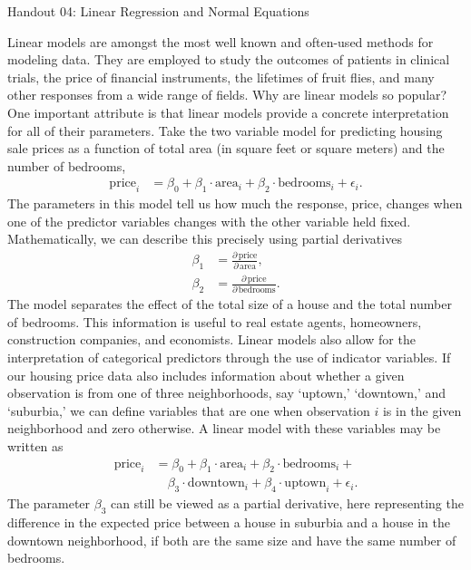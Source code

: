 \documentclass[12pt,hidelinks]{article}
\numberwithin{equation}{section}
\begin{document}
{\LARGE Handout 04: Linear Regression and Normal Equations}

\vspace*{18pt}

Linear models are amongst the most well known and often-used methods for
modeling data. They are employed to study the
outcomes of patients in clinical trials, the price of financial
instruments, the lifetimes of fruit flies, and many other
responses from a wide range of fields.
Why are linear models so popular? One important attribute is that
linear models provide a concrete interpretation for all of their
parameters. Take the two variable model for predicting housing sale
prices as a function of total area (in square feet or square meters)
and the number of bedrooms,
\begin{align}
\text{price}_i &= \beta_0 + \beta_1 \cdot \text{area}_i + \beta_2 \cdot \text{bedrooms}_i + \epsilon_i.
\end{align}
The parameters in this model tell us how much the response, price,
changes when one of the predictor variables changes with the other
variable held fixed. Mathematically, we can describe this precisely
using partial derivatives
\begin{align}
\beta_1 &= \frac{\partial \, \text{price}}{\partial \, \text{area}}, \\
\beta_2 &= \frac{\partial \, \text{price}}{\partial \, \text{bedrooms}}.
\end{align}
The model separates the effect of the total size of a house and the
total number of bedrooms. This information is useful to real estate
agents, homeowners, construction companies, and economists.
Linear models also allow for the interpretation of categorical predictors
through the use of indicator variables. If our housing price data also
includes information about whether a given observation is from one of
three neighborhoods, say `uptown,' `downtown,' and `suburbia,' we can
define variables that are one when observation $i$ is in the given
neighborhood and zero otherwise. A linear model with these variables
may be written as
\begin{align}
\text{price}_i &= \beta_0 + \beta_1 \cdot \text{area}_i + \beta_2 \cdot \text{bedrooms}_i + \\ \nonumber
              & \quad  \beta_3 \cdot \text{downtown}_i + \beta_4 \cdot \text{uptown}_i + \epsilon_i.
\end{align}
The parameter $\beta_3$ can still be viewed as a partial derivative, here
representing the difference in the expected price between a house in suburbia
and a house in the downtown neighborhood, if both are the same size and have
the same number of bedrooms.
\end{document}
